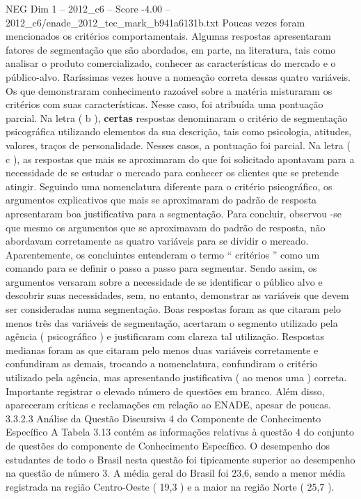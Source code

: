 \begin{textsample}{NEG Dim 1 – 2012\_c6 – Score -4.00 – 2012\_c6/enade\_2012\_tec\_mark\_b941a6131b.txt}
Poucas vezes foram mencionados os critérios comportamentais.
Algumas respostas apresentaram fatores de segmentação que são abordados, em parte, na literatura, tais como analisar o produto comercializado, conhecer as características do mercado e o público-alvo.
Raríssimas vezes houve a nomeação correta dessas quatro variáveis.
Os que demonstraram conhecimento razoável sobre a matéria misturaram os critérios com suas características.
Nesse caso, foi atribuída uma pontuação parcial.
Na letra ( b ), \textbf{certas} respostas denominaram o critério de segmentação psicográfica utilizando elementos da sua descrição, tais como psicologia, atitudes, valores, traços de personalidade.
Nesses casos, a pontuação foi parcial.
Na letra ( c ), as respostas que mais se aproximaram do que foi solicitado apontavam para a necessidade de se estudar o mercado para conhecer os clientes que se pretende atingir.
Seguindo uma nomenclatura diferente para o critério psicográfico, os argumentos explicativos que mais se aproximaram do padrão de resposta apresentaram boa justificativa para a segmentação.
Para concluir, observou -se que mesmo os argumentos que se aproximavam do padrão de resposta, não abordavam corretamente as quatro variáveis para se dividir o mercado.
Aparentemente, os concluintes entenderam o termo “ critérios ” como um comando para se definir o passo a passo para segmentar.
Sendo assim, os argumentos versaram sobre a necessidade de se identificar o público alvo e descobrir suas necessidades, sem, no entanto, demonstrar as variáveis que devem ser consideradas numa segmentação.
Boas respostas foram as que citaram pelo menos três das variáveis de segmentação, acertaram o segmento utilizado pela agência ( psicográfico ) e justificaram com clareza tal utilização.
Respostas medianas foram as que citaram pelo menos duas variáveis corretamente e confundiram as demais, trocando a nomenclatura, confundiram o critério utilizado pela agência, mas apresentando justificativa ( ao menos uma ) correta.
Importante registrar o elevado número de questões em branco.
Além disso, apareceram críticas e reclamações em relação ao ENADE, apesar de poucas. 3.3.2.3 Análise da Questão Discursiva 4 do Componente de Conhecimento Específico A Tabela 3.13 contém as informações relativas à questão 4 do conjunto de questões do componente de Conhecimento Específico.
O desempenho dos estudantes de todo o Brasil nesta questão foi tipicamente superior ao desempenho na questão de número 3.
A média geral do Brasil foi 23,6, sendo a menor média registrada na região Centro-Oeste ( 19,3 ) e a maior na região Norte ( 25,7 ).

\end{textsample}
